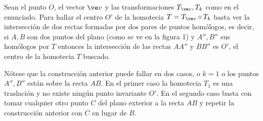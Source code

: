 		\begin{sol}
			Sean el punto $O$, el vector $\ve v$ y las transformaciones $T_{\ve v},T_k$ como en el enunciado. Para hallar el centro $O'$ de la homotecia $T = T_{\ve v}\circ T_k$ basta ver la intersección de dos rectas formadas por dos pares de puntos homólogos, es decir, si $A,B$ son dos puntos del plano (como se ve en la figura 1) y $A'',B''$ sus homólogos por $T$ entonces la intersección de las rectas $AA''$ y $BB''$ es $O'$, el centro de la homotecia $T$ buscado.
			
			Nótese que la construcción anterior puede fallar en dos casos, o $k=1$ o los puntos $A'',B''$ están sobre la recta $AB$. En el primer caso la homotecia $T_1$ es una traslación y no existe ningún punto invariante $O'$. En el segundo caso basta con tomar cualquier otro punto $C$ del plano exterior a la recta $AB$ y repetir la construcción anterior con $C$ en lugar de $B$.
		\end{sol}
